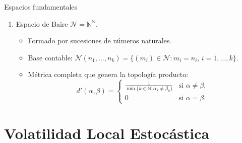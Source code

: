 \documentclass[8pt]{beamer}
\begin{document}
\begin{frame}{Espacios fundamentales}
    \begin{enumerate}
        \item Espacio de Baire $\mathcal{N} = \mathbb{N}^\mathbb N$.
        \begin{itemize}
            \item Formado por sucesiones de números naturales.
            \item Base contable: $\mathcal{N}(n_1,\dots,n_k) = \{(m_i)\in \mathcal{N}: m_i = n_i, \, i =1, \dots, k \}$.
            \item Métrica completa que genera la topología producto:
            \[
            d'(\alpha, \beta) =
            \begin{cases}
            \displaystyle\frac{1}{\min\{k \in \mathbb{N} : \alpha_k \neq \beta_k\}} & \text{si } \alpha \neq \beta, \\[1.5ex]
            0 & \text{si } \alpha = \beta.
            \end{cases}
            \]
        \end{itemize}


    \end{enumerate}
\end{frame}


\section{Volatilidad Local Estocástica}
\end{document}
